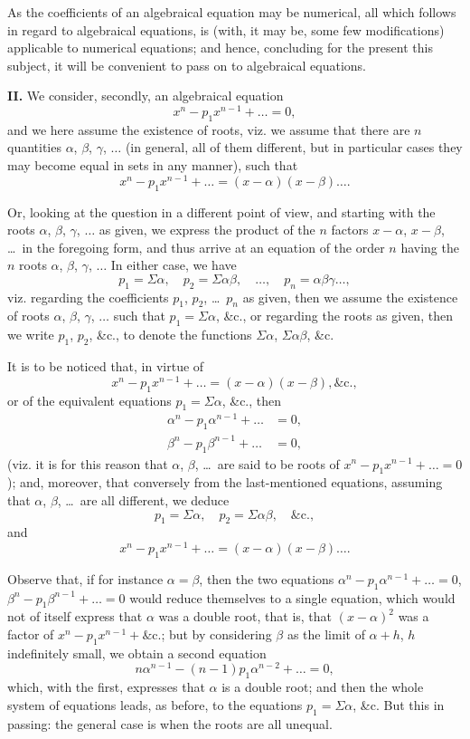 \documentclass[11pt,a4paper]{book}
\begin{document}
As the coefficients of an algebraical equation may be numerical, all which follows in regard to algebraical equations, is (with, it may be, some few modifications) applicable to numerical equations; and hence, concluding for the present this subject, it will be convenient to pass on to algebraical equations.

\medskip\noindent\textbf{II.} We consider, secondly, an algebraical equation
\[
x^n - p_1 x^{n-1} + \ldots = 0,
\]
and we here assume the existence of roots, viz. we assume that there are $n$ quantities $\alpha$, $\beta$, $\gamma$, $\ldots$ (in general, all of them different, but in particular cases they may become equal in sets in any manner), such that
\[
x^n - p_1 x^{n-1} + \ldots = (x-\alpha)(x-\beta)\ldots.
\]

Or, looking at the question in a different point of view, and starting with the roots $\alpha$, $\beta$, $\gamma$, $\ldots$ as given, we express the product of the $n$ factors $x-\alpha$, $x-\beta$, \ldots\ in the foregoing form, and thus arrive at an equation of the order $n$ having the $n$ roots $\alpha$, $\beta$, $\gamma$, $\ldots$ In either case, we have
\[
p_1 = \Sigma\alpha, \quad p_2 = \Sigma\alpha\beta, \quad \ldots, \quad p_n = \alpha\beta\gamma\ldots,
\]
viz. regarding the coefficients $p_1$, $p_2$, \ldots\ $p_n$ as given, then we assume the existence of roots $\alpha$, $\beta$, $\gamma$, $\ldots$ such that $p_1 = \Sigma\alpha$, \&c., or regarding the roots as given, then we write $p_1$, $p_2$, \&c., to denote the functions $\Sigma\alpha$, $\Sigma\alpha\beta$, \&c.

It is to be noticed that, in virtue of
\[
x^n - p_1 x^{n-1} + \ldots = (x-\alpha)(x-\beta), \&\text{c.},
\]
or of the equivalent equations $p_1 = \Sigma\alpha$, \&c., then
\begin{align*}
\alpha^n - p_1 \alpha^{n-1} + \ldots &= 0, \\
\beta^n - p_1 \beta^{n-1} + \ldots &= 0,
\end{align*}
(viz. it is for this reason that $\alpha$, $\beta$, \ldots\ are said to be roots of $x^n - p_1 x^{n-1} + \ldots = 0$); and, moreover, that conversely from the last-mentioned equations, assuming that $\alpha$, $\beta$, \ldots\ are all different, we deduce
\[
p_1 = \Sigma\alpha, \quad p_2 = \Sigma\alpha\beta, \quad \&\text{c.},
\]
and
\[
x^n - p_1 x^{n-1} + \ldots = (x-\alpha)(x-\beta)\ldots.
\]

Observe that, if for instance $\alpha = \beta$, then the two equations $\alpha^n - p_1 \alpha^{n-1} + \ldots = 0$, $\beta^n - p_1 \beta^{n-1} + \ldots = 0$ would reduce themselves to a single equation, which would not of itself express that $\alpha$ was a double root, that is, that $(x-\alpha)^2$ was a factor of $x^n - p_1 x^{n-1} + \&\text{c.}$; but by considering $\beta$ as the limit of $\alpha + h$, $h$ indefinitely small, we obtain a second equation
\[
n\alpha^{n-1} - (n-1)p_1 \alpha^{n-2} + \ldots = 0,
\]
which, with the first, expresses that $\alpha$ is a double root; and then the whole system of equations leads, as before, to the equations $p_1 = \Sigma\alpha$, \&c. But this in passing: the general case is when the roots are all unequal.
\end{document}
